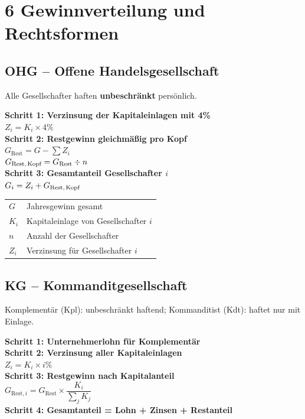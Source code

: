 \documentclass[10pt,a4paper]{article}
\begin{document}
\section{6 \quad Gewinnverteilung und Rechtsformen}

\begin{multicols}{2}

\subsection{OHG -- Offene Handelsgesellschaft}

Alle Gesellschafter haften \textbf{unbeschränkt} persönlich.

\begin{formelbox}
\textbf{Schritt 1: Verzinsung der Kapitaleinlagen mit 4\%}\\[3pt]
$Z_i = K_i \times 4\%$\\[4pt]
\textbf{Schritt 2: Restgewinn gleichmäßig pro Kopf}\\[3pt]
$G_{\text{Rest}} = G - \sum Z_i$\\
$G_{\text{Rest,\,Kopf}} = G_{\text{Rest}} \div n$\\[4pt]
\textbf{Schritt 3: Gesamtanteil Gesellschafter $i$}\\[3pt]
$G_i = Z_i + G_{\text{Rest,\,Kopf}}$
\end{formelbox}

\begin{tabular}{|L{2cm}|L{5cm}|}
\hline
{}
$G$ & Jahresgewinn gesamt \\
$K_i$ & Kapitaleinlage von Gesellschafter $i$ \\
$n$ & Anzahl der Gesellschafter \\
$Z_i$ & Verzinsung für Gesellschafter $i$ \\
\hline
\end{tabular}

\subsection{KG -- Kommanditgesellschaft}

Komplementär (Kpl): unbeschränkt haftend; Kommanditist (Kdt): haftet nur mit Einlage.

\begin{formelbox}
\textbf{Schritt 1: Unternehmerlohn für Komplementär}\\[3pt]
\textbf{Schritt 2: Verzinsung aller Kapitaleinlagen}\\[3pt]
$Z_i = K_i \times i\%$\\[4pt]
\textbf{Schritt 3: Restgewinn nach Kapitalanteil}\\[3pt]
$G_{\text{Rest},i} = G_{\text{Rest}} \times \dfrac{K_i}{\sum_j K_j}$\\[4pt]
\textbf{Schritt 4: Gesamtanteil = Lohn + Zinsen + Restanteil}
\end{formelbox}


\end{multicols}
\end{document}
